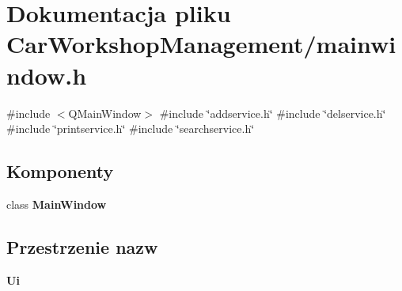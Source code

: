 \section{Dokumentacja pliku Car\+Workshop\+Management/mainwindow.h}
\label{mainwindow_8h}
{\ttfamily \#include $<$Q\+Main\+Window$>$}\newline
{\ttfamily \#include \char`\"{}addservice.\+h\char`\"{}}\newline
{\ttfamily \#include \char`\"{}delservice.\+h\char`\"{}}\newline
{\ttfamily \#include \char`\"{}printservice.\+h\char`\"{}}\newline
{\ttfamily \#include \char`\"{}searchservice.\+h\char`\"{}}\newline
\subsection*{Komponenty}
\begin{DoxyCompactItemize}
\item 
class \textbf{ Main\+Window}
\end{DoxyCompactItemize}
\subsection*{Przestrzenie nazw}
\begin{DoxyCompactItemize}
\item 
 \textbf{ Ui}
\end{DoxyCompactItemize}
